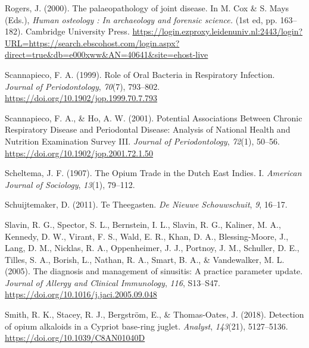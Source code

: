 \documentclass[
  letterpaper,
]{book}
\newlength{\cslhangindent}
\newlength{\cslentryspacingunit} %
\newenvironment{CSLReferences}[2] %
 {%
  \setlength{\parindent}{0pt}
  \ifodd #1
  \let\oldpar\par
  \def\par{\hangindent=\cslhangindent\oldpar}
  \fi
  \setlength{\parskip}{#2\cslentryspacingunit}
 }%
 {}
\begin{document}
\begin{CSLReferences}{1}{0}
\leavevmode{}%
Rogers, J. (2000). The palaeopathology of joint disease. In M. Cox \& S.
Mays (Eds.), \emph{Human osteology : {In} archaeology and forensic
science.} (1st ed, pp. 163--182). {Cambridge University Press}.
\url{https://login.ezproxy.leidenuniv.nl:2443/login?URL=https://search.ebscohost.com/login.aspx?direct=true\&db=e000xww\&AN=40641\&site=ehost-live}

\leavevmode{}%
Scannapieco, F. A. (1999). Role of {Oral Bacteria} in {Respiratory
Infection}. \emph{Journal of Periodontology}, \emph{70}(7), 793--802.
\url{https://doi.org/10.1902/jop.1999.70.7.793}

\leavevmode{}%
Scannapieco, F. A., \& Ho, A. W. (2001). Potential {Associations Between
Chronic Respiratory Disease} and {Periodontal Disease}: {Analysis} of
{National Health} and {Nutrition Examination Survey III}. \emph{Journal
of Periodontology}, \emph{72}(1), 50--56.
\url{https://doi.org/10.1902/jop.2001.72.1.50}

\leavevmode{}%
Scheltema, J. F. (1907). The {Opium Trade} in the {Dutch East Indies}.
{I}. \emph{American Journal of Sociology}, \emph{13}(1), 79--112.

\leavevmode{}%
Schuijtemaker, D. (2011). Te Theegasten. \emph{De Nieuwe Schouwschuit},
\emph{9}, 16--17.

\leavevmode{}%
Slavin, R. G., Spector, S. L., Bernstein, I. L., Slavin, R. G., Kaliner,
M. A., Kennedy, D. W., Virant, F. S., Wald, E. R., Khan, D. A.,
Blessing-Moore, J., Lang, D. M., Nicklas, R. A., Oppenheimer, J. J.,
Portnoy, J. M., Schuller, D. E., Tilles, S. A., Borish, L., Nathan, R.
A., Smart, B. A., \& Vandewalker, M. L. (2005). The diagnosis and
management of sinusitis: {A} practice parameter update. \emph{Journal of
Allergy and Clinical Immunology}, \emph{116}, S13--S47.
\url{https://doi.org/10.1016/j.jaci.2005.09.048}

\leavevmode{}%
Smith, R. K., Stacey, R. J., Bergström, E., \& Thomas-Oates, J. (2018).
Detection of opium alkaloids in a {Cypriot} base-ring juglet.
\emph{Analyst}, \emph{143}(21), 5127--5136.
\url{https://doi.org/10.1039/C8AN01040D}


\end{CSLReferences}
\end{document}
